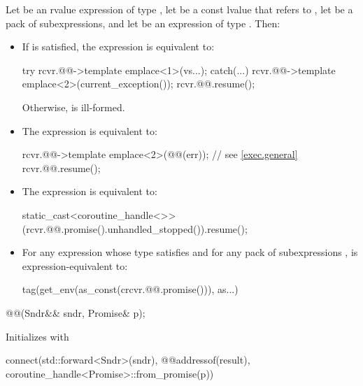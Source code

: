 \pnum
Let  be an rvalue expression of type ,
let  be a const lvalue that refers to ,
let  be a pack of subexpressions, and
let  be an expression of type . Then:
\begin{itemize}
\item
If 
is satisfied,
the expression  is equivalent to:
\begin{codeblock}
try {
  rcvr.@@->template emplace<1>(vs...);
} catch(...) {
  rcvr.@@->template emplace<2>(current_exception());
}
rcvr.@@.resume();
\end{codeblock}
Otherwise,  is ill-formed.
\item
The expression  is equivalent to:
\begin{codeblock}
rcvr.@@->template emplace<2>(@@(err));    // see \ref{exec.general}
rcvr.@@.resume();
\end{codeblock}
\item
The expression  is equivalent to:
\begin{codeblock}
static_cast<coroutine_handle<>>(rcvr.@@.promise().unhandled_stopped()).resume();
\end{codeblock}
\item
For any expression 
whose type satisfies  and
for any pack of subexpressions ,
 is expression-equivalent to:
\begin{codeblock}
tag(get_env(as_const(crcvr.@@.promise())), as...)
\end{codeblock}
\end{itemize}

\begin{itemdecl}
@@(Sndr&& sndr, Promise& p);
\end{itemdecl}

\begin{itemdescr}
\pnum
\effects
Initializes  with
\begin{codeblock}
connect(std::forward<Sndr>(sndr),
        @@{addressof(result), coroutine_handle<Promise>::from_promise(p)})
\end{codeblock}
\end{itemdescr}

